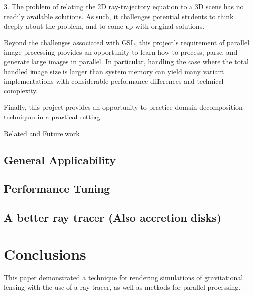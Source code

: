 3. The problem of relating the 2D ray-trajectory equation to a 3D scene has no readily available solutions. As such, it challenges potential students to think deeply about the problem, and to come up with original solutions.

Beyond the challenges associated with GSL, this project's requirement of parallel image processing provides an opportunity to learn how to process, parse, and generate large images in parallel. In particular, handling the case where the total handled image size is larger than system memory can yield many variant implementations with considerable performance differences and technical complexity. 

Finally, this project provides an opportunity to practice domain decomposition techniques in a practical setting. %

Related and Future work

\subsection {General Applicability}
\subsection {Performance Tuning}
\subsection {A better ray tracer (Also accretion disks)}


\section{Conclusions}
\label{sec:concl}

This paper demonstrated a technique for rendering simulations of gravitational lensing with the use of a ray tracer, as well as methods for parallel processing. %


